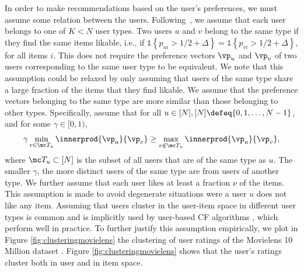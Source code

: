 \documentclass{article}
\newcommand\ind[1]{\mathds{1}\left\{#1\right\}}
\begin{document}
In order to make recommendations based on the user's preferences, we must assume some relation between the users. 
Following~\cite{bresler_latent_2014}, we assume that each user belongs to one of $K < N$ user types. 
Two users $u$ and $v$ belong to the same type if they find the same items likable, i.e., if 
$
\ind{ p_{ui} > 1/2 + \Delta } 
= 
\ind{ p_{vi} > 1/2 + \Delta }
$, for all items $i$. 
This does not require the preference vectors $\vp_u$ and $\vp_v$ of two users corresponding to the same user type to be equivalent. 
We note that this assumption could be relaxed by only assuming that users of the same type share a large fraction of the items that they find likable. 
We assume that %
the preference vectors belonging to the same type are more similar than those belonging to other types. 
Specifically, assume that for all $u \in [N], [N]\defeq \{0,1,\ldots,N-1\}$, and for some $\gamma \in [0,1)$, 
\begin{align}
\gamma \min_{ v \in \mc T_u }  \innerprod{\vp_u }{\vp_v}
\geq 
 \max_{v \notin \mc T_u }\innerprod{\vp_u }{\vp_v}, 
\label{eq:userssuffdiffthm}
\end{align}
where $\mc T_u \subset [N]$ is the subset of all users that are of the same type as $u$. 
The smaller $\gamma$, the more distinct users of the same type are from users of another type. 
We further assume that each user %
likes at least a fraction $\nu$ of the items. 
This assumption is made to avoid degenerate situations were a user $u$ does not like any item. %
%
Assuming that users cluster in the user-item space in different user types is common and is implicitly used by user-based CF  algorithms \cite{sarwar_analysis_2000}, which perform well in practice. 
To further justify this assumption empirically, we plot in Figure \ref{fig:clusteringmovielens} the clustering of user ratings of the Movielens 10 Million dataset \cite{harper_movielens_2015}. 
Figure \ref{fig:clusteringmovielens} shows that the user's ratings cluster both in user and in item space. 
\end{document}
